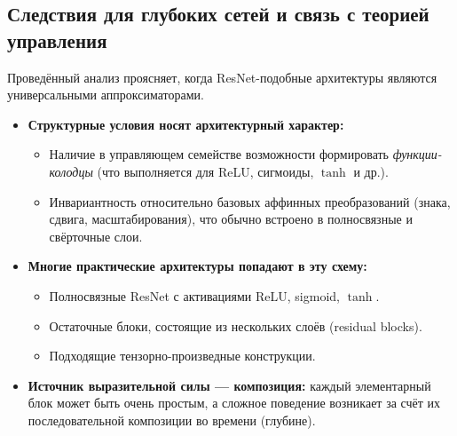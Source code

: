 \documentclass[../NDCNNAI_main.tex]{subfiles}
\begin{document}
\subsection{Следствия для глубоких сетей и связь с теорией управления}
Проведённый анализ проясняет, когда ResNet-подобные архитектуры являются универсальными аппроксиматорами.
\begin{itemize}
    \item \textbf{Структурные условия носят архитектурный характер:}
    \begin{itemize}
        \item Наличие в управляющем семействе возможности формировать \emph{функции-колодцы} (что выполняется для ReLU, сигмоиды, $\tanh$ и др.).
        \item Инвариантность относительно базовых аффинных преобразований (знака, сдвига, масштабирования), что обычно встроено в полносвязные и свёрточные слои.
    \end{itemize}
    \item \textbf{Многие практические архитектуры попадают в эту схему:}
    \begin{itemize}
        \item Полносвязные ResNet с активациями ReLU, sigmoid, $\tanh$.
        \item Остаточные блоки, состоящие из нескольких слоёв (residual blocks).
        \item Подходящие тензорно-произведные конструкции.
    \end{itemize}
    \item \textbf{Источник выразительной силы --- композиция:} каждый элементарный блок может быть очень простым, а сложное поведение возникает за счёт их последовательной композиции во времени (глубине).
\end{itemize}
\end{document}
